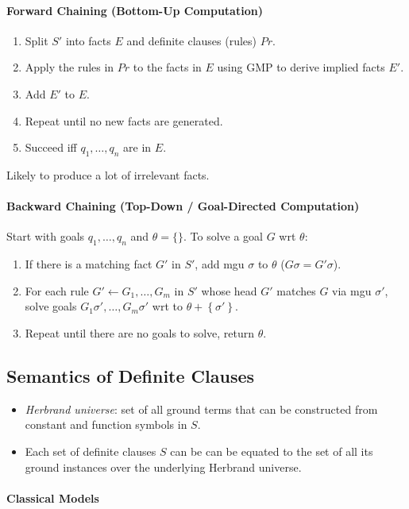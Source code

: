\documentclass[twocolumn,english]{article}
\begin{document}
\paragraph{Forward Chaining (Bottom-Up Computation)}
\begin{enumerate}
\item Split $S'$ into facts $E$ and definite clauses (rules) $Pr$.
\item Apply the rules in $Pr$ to the facts in $E$ using GMP to derive
implied facts $E'$.
\item Add $E'$ to $E$.
\item Repeat until no new facts are generated.
\item Succeed iff $q_{1},\dots,q_{n}$ are in $E$.
\end{enumerate}
Likely to produce a lot of irrelevant facts.

\paragraph{Backward Chaining (Top-Down / Goal-Directed Computation)}

Start with goals $q_{1},\dots,q_{n}$ and $\theta=\{\}$. To solve
a goal $G$ wrt $\theta$:
\begin{enumerate}
\item If there is a matching fact $G'$ in $S'$, add mgu $\sigma$ to $\theta$
($G\sigma=G'\sigma$).
\item For each rule $G'\leftarrow G_{1},\dots,G_{m}$ in $S'$ whose head
$G'$ matches $G$ via mgu $\sigma'$, solve goals $G_{1}\sigma',\dots,G_{m}\sigma'$
wrt to $\theta+\left\{ \sigma'\right\} $.
\item Repeat until there are no goals to solve, return $\theta$.
\end{enumerate}

\subsection{Semantics of Definite Clauses}
\begin{itemize}
\item \emph{Herbrand universe}: set of all ground terms that can be constructed
from constant and function symbols in $S$.
\item Each set of definite clauses $S$ can be can be equated to the set
of all its ground instances over the underlying Herbrand universe.
\end{itemize}

\paragraph{Classical Models}
\end{document}

